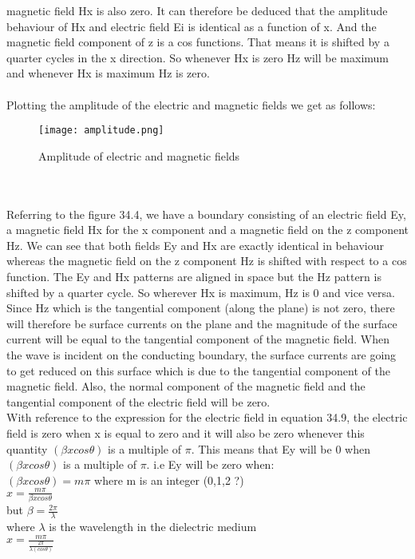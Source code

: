 magnetic field Hx is also zero. It can therefore be deduced that the
amplitude behaviour of Hx and electric field Ei is identical
as a function of x. And the magnetic field component of z is a cos
functions. That means it is shifted by a quarter cycles in the x
direction. So whenever Hx is zero Hz will be maximum and whenever Hx is
maximum Hz is zero.
\\\\ Plotting the amplitude of the electric and magnetic fields we get as follows:
\begin{figure}[h]
\centering
\texttt{[image: amplitude.png]}
\caption{Amplitude of electric and magnetic fields}
\end{figure}
\\\\ Referring to the figure 34.4, we have a boundary consisting of an electric field Ey, a magnetic field Hx for the x
component and a magnetic field on the z component Hz. We can see
that both fields Ey and Hx are exactly identical in behaviour whereas
the magnetic field on the z component Hz is shifted with respect to a
cos function. The Ey and Hx patterns are aligned in space but the Hz
pattern is shifted by a quarter cycle. So wherever Hx is maximum, Hz
is 0 and vice versa. Since Hz which is the tangential component (along the plane) is not
zero, there will therefore be surface currents on the plane and
the magnitude of the surface current will be equal to the tangential
component of the magnetic field. When the wave is incident on
the conducting boundary, the surface currents are going to get reduced
on this surface which is due to the tangential component of the
magnetic field. Also, the normal component of the magnetic field and the tangential component of the electric field will be zero.
\\ With reference to the expression for the electric field in equation 34.9,
the electric field is zero when x is equal to zero and it will also be zero whenever this quantity $(\beta xcos\theta)$ is a multiple of $\pi$. This means that
Ey will be 0 when $(\beta xcos\theta)$ is a multiple of $\pi$.
i.e Ey will be zero when:
\\ $(\beta xcos\theta) = m\pi$     where m is an integer (0,1,2 ?)
\\ $ x = \frac{m\pi}{\beta xcos\theta}$   
\\ but $\beta = \frac{2\pi}{\lambda}$ \\where $\lambda$ is the wavelength in the dielectric medium
\\ $x =\frac{m\pi}{ \frac{2\pi}{\lambda (cos\theta)}} $

